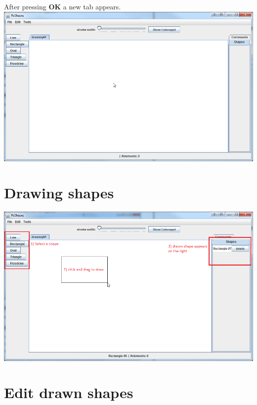 \documentclass[12pt, accentcolor=tud9c, linedtoc, bigchapter, colorback, noresetcounter, numbersubsubsec]{tudreport}
\begin{document}
After pressing \textbf{OK} a new tab appears. \\
\includegraphics[width=1\textwidth]{img/add_new_tab_3} 

\section{Drawing shapes}

\includegraphics[width=1\textwidth]{img/drawing_shape}

\section{Edit drawn shapes}
\end{document}
